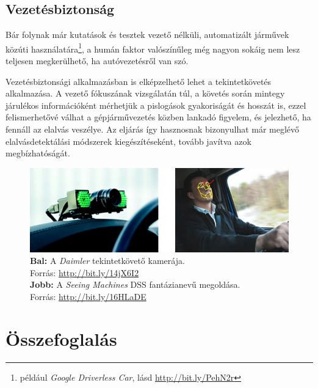 \subsection{Vezetésbiztonság}\label{sect:orvosi_felhasznalas}

Bár folynak már kutatások és tesztek vezető nélküli, automatizált járművek közúti használatára\footnote{például \emph{Google Driverless Car}, lásd \url{http://bit.ly/PehN2r}}, a humán faktor valószínűleg még nagyon sokáig nem lesz teljesen megkerülhető, ha autóvezetésről van szó.

Vezetésbiztonsági alkalmazásban is elképzelhető lehet a tekintetkövetés alkalmazása. A vezető fókuszának vizsgálatán túl, a követés során mintegy járulékos információként mérhetjük a pislogások gyakoriságát és hosszát is, ezzel felismerhetővé válhat a gépjárművezetés közben lankadó figyelem, és jelezhető, ha fennáll az elalvás veszélye. Az eljárás így hasznosnak bizonyulhat már meglévő elalvásdetektálási módszerek \cite{sleepdet} kiegészítéseként, tovább javítva azok megbízhatóságát.

\begin{figure}[!ht]
\centering
\includegraphics[width=140mm, keepaspectratio]{figures/driving.png}
\caption{\textbf{Bal:} A \emph{Daimler} tekintetkövető kamerája. \\ Forrás: \url{http://bit.ly/14jX6I2} \\
\textbf{Jobb:} A \emph{Seeing Machines} DSS fantázianevű megoldása. \\ Forrás: \url{http://bit.ly/16HLaDE}}
\label{fig:driving}
\end{figure}

\section{Összefoglalás}\label{sect:felh_osszefoglalas}


